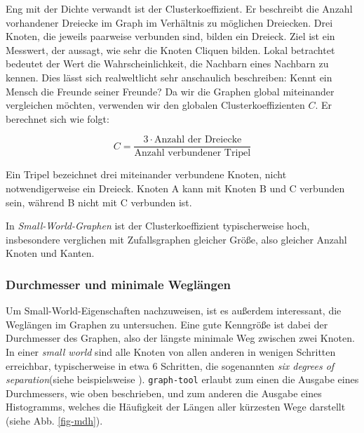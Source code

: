 \documentclass[11pt, a4paper]{article}
\begin{document}
Eng mit der Dichte verwandt ist der Clusterkoeffizient. Er beschreibt die
Anzahl vorhandener Dreiecke im Graph im Verhältnis zu möglichen Dreiecken. Drei
Knoten, die jeweils paarweise verbunden sind, bilden ein Dreieck. Ziel ist ein
Messwert, der aussagt, wie sehr die Knoten Cliquen bilden. Lokal betrachtet
bedeutet der Wert die Wahrscheinlichkeit, die Nachbarn eines Nachbarn zu kennen.
Dies lässt sich realweltlicht sehr anschaulich beschreiben: Kennt ein Mensch die 
Freunde seiner Freunde?
Da wir die Graphen global miteinander vergleichen möchten, verwenden wir den
globalen Clusterkoeffizienten $C$. Er berechnet sich wie folgt:

$$
    C = \frac{3\cdot\text{Anzahl der Dreiecke}}{\text{Anzahl verbundener Tripel}}
$$

Ein Tripel bezeichnet drei miteinander verbundene Knoten, nicht
notwendigerweise ein Dreieck. Knoten A kann mit Knoten B und C verbunden sein,
während B nicht mit C verbunden ist.

In \emph{Small-World-Graphen} ist der Clusterkoeffizient typischerweise hoch, 
insbesondere verglichen mit Zufallsgraphen gleicher Größe, also gleicher Anzahl
Knoten und Kanten\cite{Newman2003}.\\


\subsubsection{Durchmesser und minimale Wegl\"angen}
Um Small-World-Eigenschaften nachzuweisen, ist es außerdem interessant, die
Weglängen im Graphen zu untersuchen. Eine gute Kenngröße ist dabei der Durchmesser
des Graphen, also der längste minimale Weg zwischen zwei Knoten. In einer
\emph{small world} sind alle Knoten von allen anderen in wenigen Schritten
erreichbar, typischerweise in etwa 6 Schritten, die sogenannten 
\emph{six degrees of separation}(siehe beispielsweise \cite{Newman2003}). 
\texttt{graph-tool} erlaubt zum einen die Ausgabe eines Durchmessers, wie oben
 beschrieben, und zum anderen die Ausgabe eines Histogramms, welches die 
Häufigkeit der Längen aller kürzesten Wege darstellt (siehe Abb. \ref{fig-mdh}).
\end{document}

